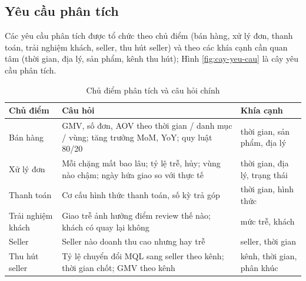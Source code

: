 \subsection{Yêu cầu phân tích}
Các yêu cầu phân tích được tổ chức theo chủ điểm (bán hàng, xử lý đơn, thanh toán, trải nghiệm khách, seller, thu hút seller) và theo các khía cạnh cần quan tâm (thời gian, địa lý, sản phẩm, kênh thu hút); Hình \ref{fig:cay-yeu-cau} là cây yêu cầu phân tích.
\begin{table}[htbp]\centering\small\caption{Chủ điểm phân tích và câu hỏi chính}\label{tab:chu-diem}
\begin{tabular}{p{2.8cm}p{8cm}p{3.6cm}}\toprule
\textbf{Chủ điểm} & \textbf{Câu hỏi} & \textbf{Khía cạnh}\\\midrule
Bán hàng & GMV, số đơn, AOV theo thời gian / danh mục / vùng; tăng trưởng MoM, YoY; quy luật 80/20 & thời gian, sản phẩm, địa lý\\
Xử lý đơn & Mỗi chặng mất bao lâu; tỷ lệ trễ, hủy; vùng nào chậm; ngày hứa giao so với thực tế & thời gian, địa lý, trạng thái\\
Thanh toán & Cơ cấu hình thức thanh toán, số kỳ trả góp & thời gian, hình thức\\
Trải nghiệm khách & Giao trễ ảnh hưởng điểm review thế nào; khách có quay lại không & mức trễ, khách\\
Seller & Seller nào doanh thu cao nhưng hay trễ & seller, thời gian\\
Thu hút seller & Tỷ lệ chuyển đổi MQL sang seller theo kênh; thời gian chốt; GMV theo kênh & kênh, thời gian, phân khúc\\\bottomrule
\end{tabular}\end{table}
